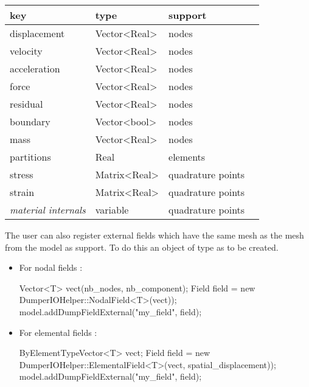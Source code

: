 \begin{tabular}{llll}
  \toprule
  key          &    type      & support \\
  \midrule
  displacement & Vector<Real> & nodes  \\
  velocity     & Vector<Real> & nodes  \\
  acceleration & Vector<Real> & nodes  \\
  force	     & Vector<Real> & nodes  \\
  residual     & Vector<Real> & nodes  \\
  boundary     & Vector<bool> & nodes  \\
  mass         & Vector<Real> & nodes  \\
  partitions   & Real         & elements \\
  stress & Matrix<Real> & quadrature points  \\
  strain & Matrix<Real> & quadrature points  \\
  \textit{material internals} & variable  & quadrature points  \\
\bottomrule
\end{tabular}


The user can also register external fields which have the same mesh as the mesh from the model as support. To do this an object of type  as to be created.

\begin{itemize}
\item For nodal fields :
\begin{cpp}
  Vector<T> vect(nb_nodes, nb_component);
  Field field = new DumperIOHelper::NodalField<T>(vect));
  model.addDumpFieldExternal("my_field", field);
\end{cpp}

\item For elemental fields :
\begin{cpp}
  ByElementTypeVector<T> vect;
  Field field = new DumperIOHelper::ElementalField<T>(vect, spatial_displacement));
  model.addDumpFieldExternal("my_field", field);
\end{cpp}
\end{itemize}


